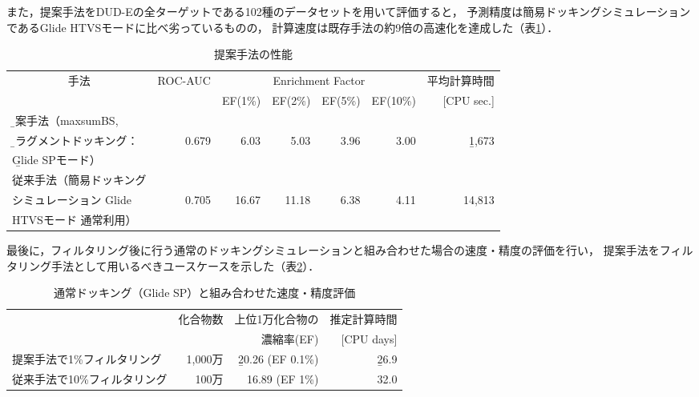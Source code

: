 \newpage

また，提案手法をDUD-Eの全ターゲットである102種のデータセットを用いて評価すると，
予測精度は簡易ドッキングシミュレーションであるGlide HTVSモードに比べ劣っているものの，
計算速度は既存手法の約9倍の高速化を達成した（表\ref{table:conclusion_2}）．
\begin{table}[h] \centering
	\caption{提案手法の性能}
	\label{table:conclusion_2}
	\begin{tabular}{l|rrrrr|r}
	\hline
	\multicolumn{1}{c|}{\multirow{2}{*}{手法}}	&\multirow{2}{*}{ROC-AUC}	&\multicolumn{4}{c|}{Enrichment Factor}	&平均計算時間	\\
										&						&EF(1\%)	&EF(2\%)	&EF(5\%)	&EF(10\%)	&[CPU sec.]		\\ \hline
	\b{提案手法（maxsumBS, }	&&&&&& \\
	\b{フラグメントドッキング：}				&0.679					&6.03	&5.03	&3.96	&3.00		&\b{1,673}		\\
	\b{Glide SPモード）}			&&&&&& \\ \hline
	従来手法（簡易ドッキング	&&&&&& \\
	シミュレーション	Glide 		&0.705&16.67&11.18&6.38&4.11&14,813 \\ 
	HTVSモード 通常利用）		&&&&&& \\
	\hline
	\end{tabular}
\end{table}

最後に，フィルタリング後に行う通常のドッキングシミュレーションと組み合わせた場合の速度・精度の評価を行い，
提案手法をフィルタリング手法として用いるべきユースケースを示した（表\ref{table:conclusion_3}）．
\begin{table}[h] \centering
	\caption{通常ドッキング（Glide SP）と組み合わせた速度・精度評価}
	\label{table:conclusion_3}
	\begin{tabular}{l|rrr}
	\hline
												&\multirow{2}{*}{化合物数}	&上位1万化合物の		&推定計算時間	\\
												&														&濃縮率(EF)				&[CPU days]		\\ \hline
	提案手法で1\%フィルタリング		&1,000万											&\b{20.26 (EF 0.1\%)}		&\b{26.9}				\\
	従来手法で10\%フィルタリング	&100万												&16.89 (EF 1\%)			&32.0				\\ \hline
	\end{tabular}
\end{table}

\newpage

